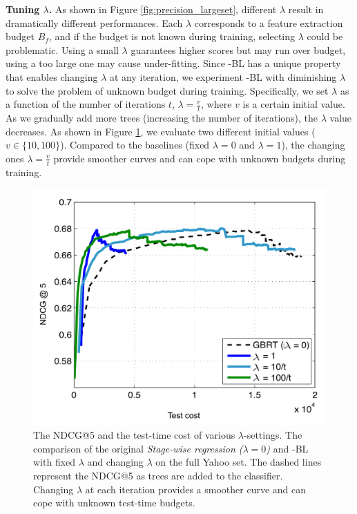 \textbf{Tuning $\lambda$.}
As shown in Figure \ref{fig:precision_largeset}, different $\lambda$ result in dramatically different performances. Each $\lambda$ corresponds to a feature extraction budget $B_f$, and if the budget is not known during training, selecting $\lambda$ could be problematic. Using a small $\lambda$ guarantees higher scores but may run over budget, using a too large one may cause under-fitting. Since \name{}-BL has a unique property that enables changing $\lambda$ at any iteration, we experiment \name{}-BL with diminishing $\lambda$ to solve the problem of unknown budget during training. Specifically, we set $\lambda$ as a function of the number of iterations $t$, $\lambda = \frac{v}{t}$, where $v$ is a certain initial value. As we gradually add more trees (increasing the number of iterations), the $\lambda$ value decreases. As shown in Figure \ref{fig:lambda}, we evaluate two different initial values ($v \in \{10, 100\}$). Compared to the baselines (fixed $\lambda = 0$ and $\lambda = 1$), the changing ones $\lambda = \frac{v}{t}$ provide smoother curves and can cope with unknown budgets during training. 

\begin{figure}[t]
\centerline{
\includegraphics[width = .67\textwidth]{plots/precision_tune}
}
\vspace{-1.5ex}
\caption{The NDCG@5 and the test-time cost of various $\lambda$-settings.
The comparison of the original \emph{Stage-wise regression ($\lambda = 0$)} and \name{}-BL with fixed $\lambda$ and changing $\lambda$ on the full Yahoo set. The dashed lines represent the NDCG@5 as trees are  added to the classifier. Changing $\lambda$ at each iteration provides a smoother curve and can cope with unknown test-time budgets. 
\label{fig:lambda} }
\end{figure}
 
